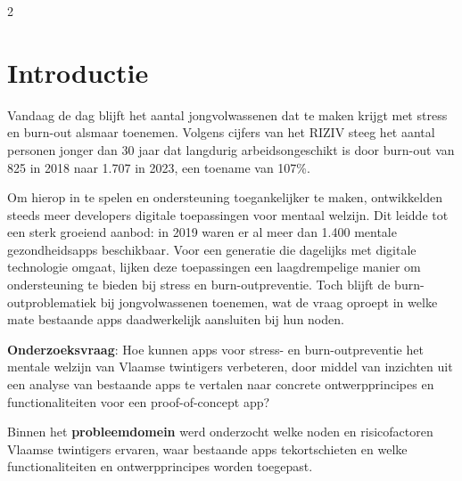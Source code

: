 \documentclass[a0,portrait]{hogent-poster}
\begin{document}
\begin{multicols}{2} %

\section{Introductie}

\vspace{1em}

Vandaag de dag blijft het aantal jongvolwassenen dat te maken krijgt met stress en burn-out alsmaar toenemen. Volgens cijfers van het RIZIV steeg het aantal personen jonger dan 30 jaar dat langdurig arbeidsongeschikt is door burn-out van 825 in 2018 naar 1.707 in 2023, een toename van 107\%.

\vspace{1em}

Om hierop in te spelen en ondersteuning toegankelijker te maken, ontwikkelden steeds meer developers digitale toepassingen voor mentaal welzijn. Dit leidde tot een sterk groeiend aanbod: in 2019 waren er al meer dan 1.400 mentale gezondheidsapps beschikbaar. Voor een generatie die dagelijks met digitale technologie omgaat, lijken deze toepassingen een laagdrempelige manier om ondersteuning te bieden bij stress en burn-outpreventie. Toch blijft de burn-outproblematiek bij jongvolwassenen toenemen, wat de vraag oproept in welke mate bestaande apps daadwerkelijk aansluiten bij hun noden.

\vspace{1em}

\begin{tcolorbox}[
    width=\columnwidth,
    colback=green!10,
    colframe=green,
    boxrule=1pt,
    arc=6pt,
    outer arc=6pt,
    left=20pt,
    right=20pt,
    top=15pt,
    bottom=15pt,
    enhanced
]
    \medium
    \textbf{Onderzoeksvraag}: 
    Hoe kunnen apps voor stress- en burn-outpreventie het mentale welzijn van Vlaamse twintigers verbeteren, door middel van inzichten uit een analyse van bestaande apps te vertalen naar concrete ontwerpprincipes en functionaliteiten voor een proof-of-concept app?
\end{tcolorbox}

\vspace{1em}

Binnen het \textbf{probleemdomein} werd onderzocht welke noden en risicofactoren Vlaamse twintigers ervaren, waar bestaande apps tekortschieten en welke functionaliteiten en ontwerpprincipes worden toegepast.


\end{multicols}
\end{document}
